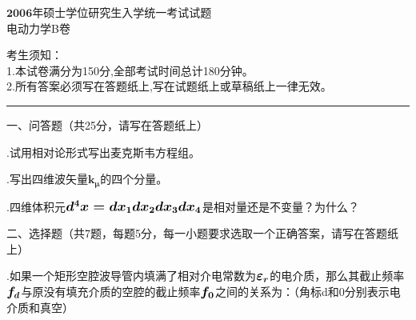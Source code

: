 \begin{center}
	\heiti
	\LARGE{$\boldsymbol{2006}$年硕士学位研究生入学统一考试试题\\
	电动力学B卷}

\end{center}
\noindent
考生须知：\\
1.本试卷满分为150分,全部考试时间总计180分钟。\\
2.所有答案必须写在答题纸上,写在试题纸上或草稿纸上一律无效。

\vspace*{2ex}
\hrule
\vspace*{4ex}


\setcounter{page}{1}%
\pagestyle{mypagestyle}

\onehalfspacing
\vspace{0.8cm}

\noindent
一、\hspace{0.2em}问答题（共25分，请写在答题纸上）

.\hspace{0.8em}试用相对论形式写出麦克斯韦方程组。

.\hspace{0.8em}写出四维波矢量$\boldsymbol{k_{\mu}}$的四个分量。

.\hspace{0.8em}四维体积元$\large{\boldsymbol{d^4x=dx_1dx_2dx_3dx_4}}$是相对量还是不变量？为什么？

\vspace{0.5cm}
\noindent
二、\hspace{0.2em}选择题（共7题，每题5分，每一小题要求选取一个正确答案，请写在答题纸上）

.\hspace{0.8em}如果一个矩形空腔波导管内填满了相对介电常数为$\large{\boldsymbol{\varepsilon_r}}$的电介质，那么其截止频率$\large{\boldsymbol{f_d}}$与原没有填充介质的空腔的截止频率$\large{\boldsymbol{f_0}}$之间的关系为：（角标d和0分别表示电介质和真空）

